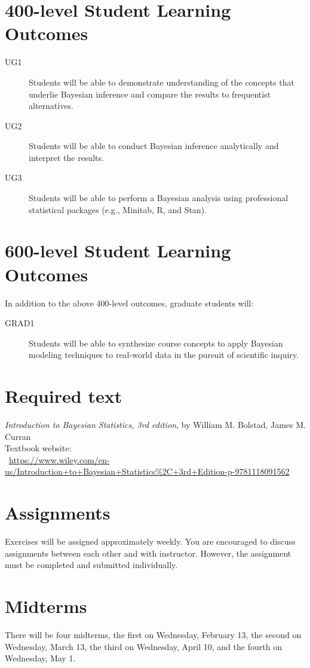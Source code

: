 \documentclass[11pt,onecolumn]{article}
\begin{document}
\section*{400-level Student Learning Outcomes}
\begin{description}
\item[UG1] Students will be able to demonstrate understanding of the concepts that underlie Bayesian inference and compare the results to frequentist alternatives.
\item[UG2] Students will be able to conduct Bayesian inference analytically and interpret the results.
\item[UG3] Students will be able to perform a Bayesian analysis using professional statistical packages (e.g., \textsf{Minitab}, \textsf{R}, and \textsf{Stan}).
\end{description}

\section*{600-level Student Learning Outcomes}
In addition to the above 400-level outcomes, graduate students will:
\begin{description}
\item[GRAD1] Students will be able to synthesize course concepts to apply Bayesian modeling techniques to real-world data in the pursuit of scientific inquiry.
\end{description}

\section*{Required text}
\emph{Introduction to Bayesian Statistics, 3rd edition}, by William M. Bolstad, James M. Curran\\
Textbook website:\\~\url{https://www.wiley.com/en-us/Introduction+to+Bayesian+Statistics%2C+3rd+Edition-p-9781118091562}

\section*{Assignments}
Exercises will be assigned approximately weekly. You are encouraged to discuss assignments between each other and with instructor. However, the assignment must be completed and submitted individually. 

\section*{Midterms}
There will be four midterms, the first on Wednesday, February 13, the second on Wednesday, March 13, the third on Wednesday, April 10, and the fourth on Wednesday, May 1.
\end{document}
